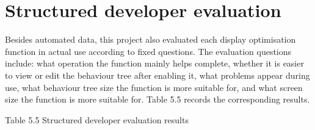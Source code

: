 \section{Structured developer evaluation}

Besides automated data, this project also evaluated each display optimisation function in actual use according to fixed questions. The evaluation questions include: what operation the function mainly helps complete, whether it is easier to view or edit the behaviour tree after enabling it, what problems appear during use, what behaviour tree size the function is more suitable for, and what screen size the function is more suitable for. Table 5.5 records the corresponding results.

Table 5.5 Structured developer evaluation results

\begin{center}


\end{center}
